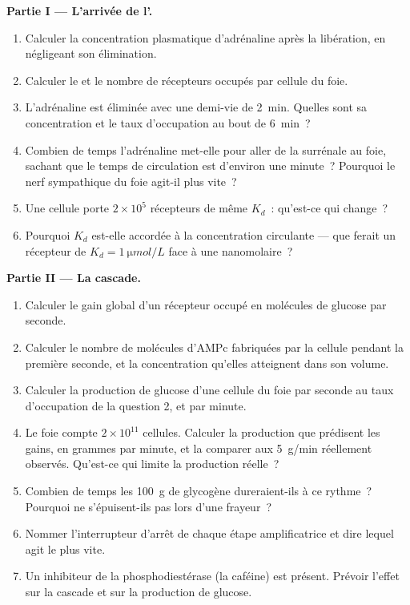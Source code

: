 \begin{problem}
\medskip
\noindent\textbf{Partie I --- L'arrivée de l'.}
\begin{enumerate}
  \item Calculer la concentration plasmatique d'adrénaline après la
        libération, en négligeant son élimination.
  \item Calculer le  et le nombre de
        récepteurs occupés par cellule du foie.
  \item L'adrénaline est éliminée avec une demi-vie de \qty{2}{min}.
        Quelles sont sa concentration et le taux d'occupation au bout de
        \qty{6}{min}~?
  \item Combien de temps l'adrénaline met-elle pour aller de la
        surrénale au foie, sachant que le temps de circulation est
        d'environ une minute~? Pourquoi le nerf sympathique du foie
        agit-il plus vite~?
  \item Une cellule porte $2\times 10^{5}$ récepteurs de même $K_d$~:
        qu'est-ce qui change~?
  \item Pourquoi $K_d$ est-elle accordée à la concentration circulante ---
        que ferait un récepteur de $K_d = \qty{1}{\micro mol/L}$ face à
        une  nanomolaire~?
\end{enumerate}

\medskip
\noindent\textbf{Partie II --- La cascade.}
\begin{enumerate}[resume]
  \item Calculer le gain global d'un récepteur occupé en molécules de
        glucose par seconde.
  \item Calculer le nombre de molécules d'AMPc fabriquées par la cellule
        pendant la première seconde, et la concentration qu'elles
        atteignent dans son volume.
  \item Calculer la production de glucose d'une cellule du foie par
        seconde au taux d'occupation de la question 2, et par minute.
  \item Le foie compte $2\times 10^{11}$ cellules. Calculer la
        production que prédisent les gains, en grammes par minute, et la
        comparer aux \qty{5}{g/min} réellement observés. Qu'est-ce qui
        limite la production réelle~?
  \item Combien de temps les \qty{100}{g} de glycogène dureraient-ils à
        ce rythme~? Pourquoi ne s'épuisent-ils pas lors d'une frayeur~?
  \item Nommer l'interrupteur d'arrêt de chaque étape amplificatrice et
        dire lequel agit le plus vite.
  \item Un inhibiteur de la phosphodiestérase (la caféine) est présent.
        Prévoir l'effet sur la cascade et sur la production de glucose.
\end{enumerate}


\end{problem}
